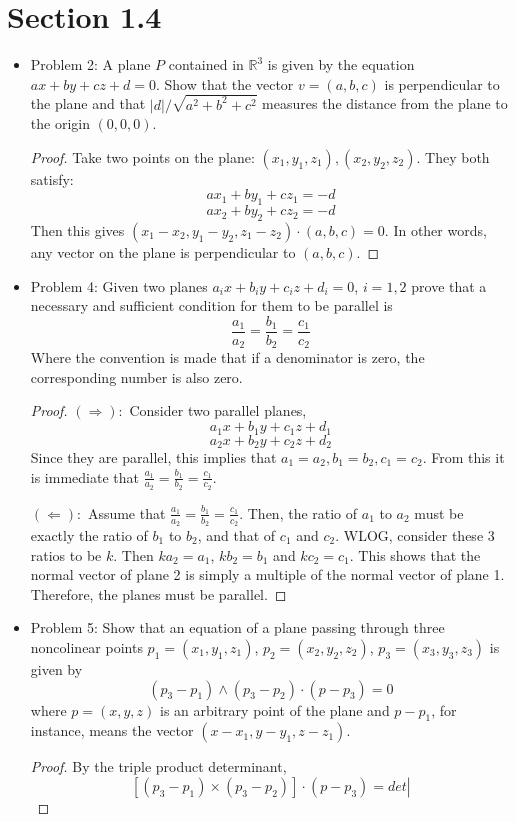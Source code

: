 \documentclass[a4paper,17pt]{extarticle}
\title{\scalebox{2}{Math 553 Homework 2}}
\author{\scalebox{1.5}{Theo Koss}}
\date{February 2022}
\theoremstyle{definition}
\renewcommand{\skip}{\par\null\par}
\newcommand{\R}{\mathbb{R}}
\begin{document}
\maketitle
\section{Section 1.4}
\begin{itemize}
    \item Problem 2: A plane $P$ contained in $\R^3$ is given by the equation $ax+by+cz+d=0$. Show that the vector $v=(a,b,c)$ is perpendicular to the plane and that $|d|/\sqrt{a^2+b^2+c^2}$ measures the distance from the plane to the origin $(0,0,0)$.\begin{proof}Take two points on the plane: $(x_1,y_1,z_1),(x_2,y_2,z_2)$. They both satisfy: $$ax_1+by_1+cz_1=-d$$ $$ax_2+by_2+cz_2=-d$$ Then this gives $(x_1-x_2,y_1-y_2,z_1-z_2)\cdot(a,b,c)=0$. In other words, any vector on the plane is perpendicular to $(a,b,c)$.
\end{proof}
    \item Problem 4: Given two planes $a_ix+b_iy+c_iz+d_i=0$, $i=1,2$ prove that a necessary and sufficient condition for them to be parallel is $$\frac{a_1}{a_2}=\frac{b_1}{b_2}=\frac{c_1}{c_2}$$ Where the convention is made that if a denominator is zero, the corresponding number is  also zero.\begin{proof}$(\Longrightarrow):$ Consider two parallel planes, $$a_1x+b_1y+c_1z+d_1$$ $$a_2x+b_2y+c_2z+d_2$$
    Since they are parallel, this implies that $a_1=a_2,b_1=b_2,c_1=c_2$. From this it is immediate that $\frac{a_1}{a_2}=\frac{b_1}{b_2}=\frac{c_1}{c_2}$.\skip$(\Longleftarrow):$ Assume that $\frac{a_1}{a_2}=\frac{b_1}{b_2}=\frac{c_1}{c_2}$. Then, the ratio of $a_1$ to $a_2$ must be exactly the ratio of $b_1$ to $b_2$, and that of $c_1$ and $c_2$. WLOG, consider these 3 ratios to be $k$. Then $ka_2=a_1$, $kb_2=b_1$ and $kc_2=c_1$. This shows that the normal vector of plane 2 is simply a multiple of the normal vector of plane 1. Therefore, the planes must be parallel.
    \end{proof}
    \item Problem 5: Show that an equation of a plane passing through three noncolinear points $p_1=(x_1,y_1,z_1)$, $p_2=(x_2,y_2,z_2)$, $p_3=(x_3,y_3,z_3)$ is given by $$(p_3-p_1)\wedge(p_3-p_2)\cdot(p-p_3)=0$$ where $p=(x,y,z)$ is an arbitrary point of the plane and $p-p_1$, for instance, means the vector $(x-x_1,y-y_1,z-z_1)$.\begin{proof}By the triple product determinant,$$[(p_3-p_1)\times(p_3-p_2)]\cdot(p-p_3)=det\left|
$$
\end{proof}
\end{itemize}
\end{document}

